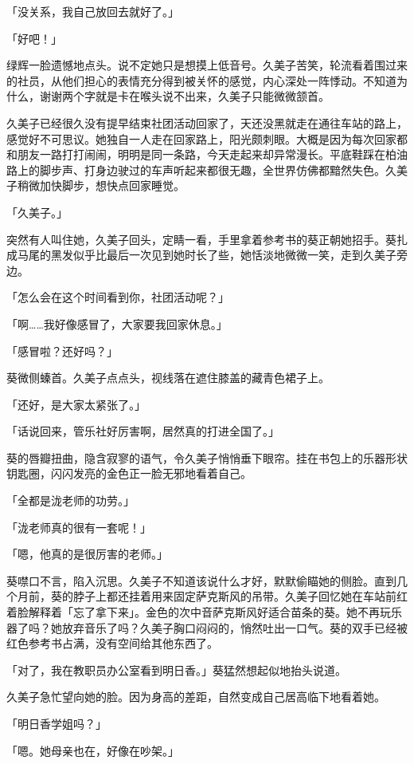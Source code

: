 \documentclass[UTF8]{ctexart}
\begin{document}
    「没关系，我自己放回去就好了。」 

    「好吧！」 

    绿辉一脸遗憾地点头。说不定她只是想摸上低音号。久美子苦笑，轮流看着围过来的社员，从他们担心的表情充分得到被关怀的感觉，内心深处一阵悸动。不知道为什么，谢谢两个字就是卡在喉头说不出来，久美子只能微微颔首。 

    久美子已经很久没有提早结束社团活动回家了，天还没黑就走在通往车站的路上，感觉好不可思议。她独自一人走在回家路上，阳光颇刺眼。大概是因为每次回家都和朋友一路打打闹闹，明明是同一条路，今天走起来却异常漫长。平底鞋踩在柏油路上的脚步声、打身边驶过的车声听起来都很无趣，全世界仿佛都黯然失色。久美子稍微加快脚步，想快点回家睡觉。 

    「久美子。」 

    突然有人叫住她，久美子回头，定睛一看，手里拿着参考书的葵正朝她招手。葵扎成马尾的黑发似乎比最后一次见到她时长了些，她恬淡地微微一笑，走到久美子旁边。 

    「怎么会在这个时间看到你，社团活动呢？」 

    「啊……我好像感冒了，大家要我回家休息。」 

    「感冒啦？还好吗？」 

    葵微侧螓首。久美子点点头，视线落在遮住膝盖的藏青色裙子上。 

    「还好，是大家太紧张了。」 

    「话说回来，管乐社好厉害啊，居然真的打进全国了。」 

    葵的唇瓣扭曲，隐含寂寥的语气，令久美子悄悄垂下眼帘。挂在书包上的乐器形状钥匙圈，闪闪发亮的金色正一脸无邪地看着自己。 

    「全都是泷老师的功劳。」 

    「泷老师真的很有一套呢！」 

    「嗯，他真的是很厉害的老师。」 

    葵噤口不言，陷入沉思。久美子不知道该说什么才好，默默偷瞄她的侧脸。直到几个月前，葵的脖子上都还挂着用来固定萨克斯风的吊带。久美子回忆她在车站前红着脸解释着「忘了拿下来」。金色的次中音萨克斯风好适合苗条的葵。她不再玩乐器了吗？她放弃音乐了吗？久美子胸口闷闷的，悄然吐出一口气。葵的双手已经被红色参考书占满，没有空间给其他东西了。 

    「对了，我在教职员办公室看到明日香。」葵猛然想起似地抬头说道。 

    久美子急忙望向她的脸。因为身高的差距，自然变成自己居高临下地看着她。 

    「明日香学姐吗？」 

    「嗯。她母亲也在，好像在吵架。」 
\end{document}

